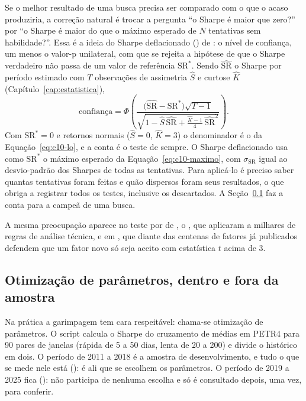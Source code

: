 Se o melhor resultado de uma busca precisa ser comparado com o que o acaso produziria, a correção natural é trocar a pergunta ``o Sharpe é maior que zero?'' por ``o Sharpe é maior do que o máximo esperado de $N$ tentativas sem habilidade?''. Essa é a ideia do Sharpe deflacionado () de \citet{bailey2014dsr}: o nível de confiança, um menos o valor-p unilateral, com que se rejeita a hipótese de que o Sharpe verdadeiro não passa de um valor de referência $\text{SR}^*$. Sendo $\widehat{\text{SR}}$ o Sharpe por período estimado com $T$ observações de assimetria $\hat S$ e curtose $\hat K$ (Capítulo~\ref{cap:estatistica}),
\begin{equation}
  \text{confiança} = \Phi\!\left(\frac{\bigl(\widehat{\text{SR}} - \text{SR}^*\bigr)\sqrt{T-1}}{\sqrt{1 - \hat S\,\widehat{\text{SR}} + \tfrac{\hat K - 1}{4}\,\widehat{\text{SR}}^2}}\right) .
  \label{eq:c10-dsr}
\end{equation}
Com $\text{SR}^* = 0$ e retornos normais ($\hat S = 0$, $\hat K = 3$) o denominador é o da Equação~\eqref{eq:c10-lo}, e a conta é o teste de sempre. O Sharpe deflacionado usa como $\text{SR}^*$ o máximo esperado da Equação~\eqref{eq:c10-maximo}, com $\sigma_{\text{SR}}$ igual ao desvio-padrão dos Sharpes de todas as tentativas. Para aplicá-lo é preciso saber quantas tentativas foram feitas e quão dispersos foram seus resultados, o que obriga a registrar todos os testes, inclusive os descartados. A Seção~\ref{sec:c10-otimizacao} faz a conta para a campeã de uma busca.

A mesma preocupação aparece no teste por  de \citet{white2000}, o , que \citet{sullivan1999} aplicaram a milhares de regras de análise técnica, e em \citet{harvey2016}, que diante das centenas de fatores já publicados defendem que um fator novo só seja aceito com estatística $t$ acima de 3.

\subsection{Otimização de parâmetros, dentro e fora da amostra}
\label{sec:c10-otimizacao}

Na prática a garimpagem tem cara respeitável: chama-se otimização de parâmetros. O script  calcula o Sharpe do cruzamento de médias em PETR4 para 90 pares de janelas (rápida de 5 a 50 dias, lenta de 20 a 200) e divide o histórico em dois. O período de 2011 a 2018 é a amostra de desenvolvimento, e tudo o que se mede nele está  (): é ali que se escolhem os parâmetros. O período de 2019 a 2025 fica  (): não participa de nenhuma escolha e só é consultado depois, uma vez, para conferir.

